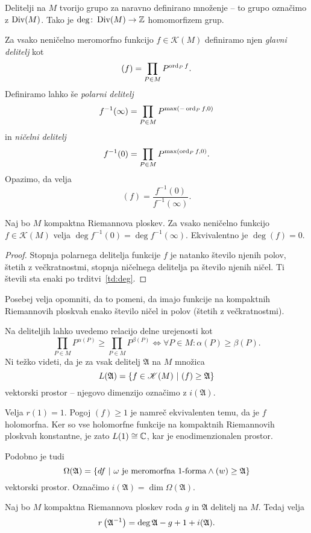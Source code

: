 Delitelji na $M$ tvorijo grupo za naravno definirano množenje --
to grupo označimo z $\operatorname{Div}(M)$. Tako je
$\deg \colon \operatorname{Div}(M) \to \mathbb{Z}$ homomorfizem grup.

Za vsako neničelno meromorfno funkcijo $f \in \mathscr{K}(M)$
definiramo njen \emph{glavni delitelj} kot
\[
(f) = \prod_{P \in M} P^{\operatorname{ord}_P f}.
\]
Definiramo lahko še \emph{polarni delitelj}
\[
f^{-1}(\infty) = \prod_{P \in M} P^{\max(-\operatorname{ord}_P f, 0)}
\]
in \emph{ničelni delitelj}
\[
f^{-1}(0) = \prod_{P \in M} P^{\max(\operatorname{ord}_P f, 0)}.
\]
Opazimo, da velja
\[
(f) = \frac{f^{-1}(0)}{f^{-1}(\infty)}.
\]

\begin{lema}
Naj bo $M$ kompaktna Riemannova ploskev. Za vsako neničelno
funkcijo $f \in \mathscr{K}(M)$ velja
$\deg f^{-1}(0) = \deg f^{-1}(\infty)$. Ekvivalentno je
$\deg (f) = 0$.
\end{lema}

\begin{proof}
Stopnja polarnega delitelja funkcije $f$ je natanko število njenih
polov, štetih z večkratnostmi, stopnja ničelnega delitelja pa
število njenih ničel. Ti števili sta enaki po
trditvi~\ref{td:deg}.
\end{proof}

Posebej velja opomniti, da to pomeni, da imajo funkcije na
kompaktnih Riemannovih ploskvah enako število ničel in polov
(štetih z večkratnostmi).

Na deliteljih lahko uvedemo relacijo delne urejenosti kot
\[
\prod_{P \in M} P^{\alpha(P)} \geq \prod_{P \in M} P^{\beta(P)}
\iff
\forall P \in M \colon \alpha(P) \geq \beta(P).
\]
Ni težko videti, da je za vsak delitelj $\mathfrak{A}$ na $M$
množica
\[
L(\mathfrak{A}) =
\left\{f \in \mathscr{K}(M)~\middle\vert~(f) \geq \mathfrak{A}\right\}
\]
vektorski prostor -- njegovo dimenzijo označimo z
$i(\mathfrak{A})$.

\begin{zgled}
Velja $r(1) = 1$. Pogoj $(f) \geq 1$ je namreč ekvivalenten temu,
da je $f$ holomorfna. Ker so vse holomorfne funkcije na kompaktnih
Riemannovih ploskvah konstantne, je zato $L(1) \cong \mathbb{C}$, kar je
enodimenzionalen prostor.
\end{zgled}

Podobno je tudi
\[
\Omega(\mathfrak{A}) =
\left\{df~\middle\vert~\text{$\omega$ je meromorfna $1$-forma} \land
(w) \geq \mathfrak{A}\right\}
\]
vektorski prostor. Označimo
$i(\mathfrak{A}) = \dim \Omega(\mathfrak{A})$.

\begin{izrek}
Naj bo $M$ kompaktna Riemannova ploskev roda $g$ in $\mathfrak{A}$
delitelj na $M$. Tedaj velja
\[
r \left(\mathfrak{A}^{-1}\right) =
\deg \mathfrak{A} - g + 1 + i(\mathfrak{A}).
\]
\end{izrek}

